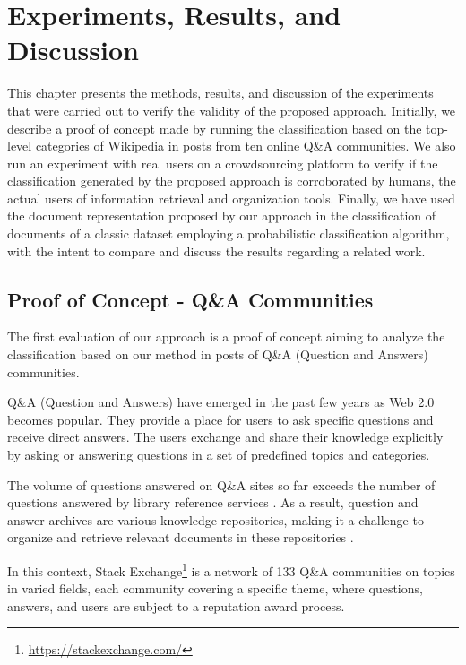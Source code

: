 \chapter{\hspace*{3pt} Experiments, Results, and Discussion}




\label{chapter:experiments}

This chapter presents the methods, results, and discussion of the experiments that were carried out to verify the validity of the proposed approach. Initially, we describe a proof of concept made by running the classification based on the top-level categories of Wikipedia in posts from ten online Q\&A communities.  We also run an experiment with real users on a crowdsourcing platform to verify if the classification generated by the proposed approach is corroborated by humans, the actual users of information retrieval and organization tools.
Finally, we have used the document representation proposed by our approach in the classification of documents of a classic dataset employing a probabilistic classification algorithm, with the intent to compare and discuss the results regarding a related work.

\section{\hspace*{3pt} Proof of Concept - Q\&A Communities}
\label{section:proof-of-concept}

The first evaluation of our approach is a proof of concept aiming to analyze the classification based on our method in posts of  Q\&A (Question and Answers) communities. 

Q\&A (Question and Answers) have emerged in the past few years as Web 2.0 becomes popular. They provide a place for users to ask specific questions and receive direct answers. 
The users exchange and share their knowledge explicitly by asking or answering questions in a set of predefined topics and categories. 

The volume of questions answered on Q\&A sites so far exceeds the number of questions answered by library reference services \cite{Shah:2010}. As a result, question and answer archives are various knowledge repositories, making it a challenge to organize and retrieve relevant documents in these repositories \cite{Andrzejewski:2009}.


In this context, Stack Exchange\footnote{\url{https://stackexchange.com/}}
is a network of 133 Q\&A communities on topics in varied fields, each community covering a specific theme, where questions, answers, and users are subject to a reputation award process.

